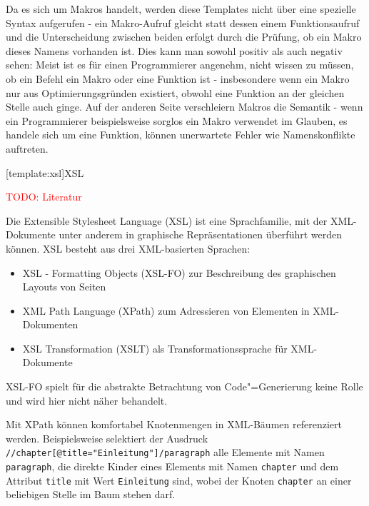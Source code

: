 \documentclass[11pt, a4paper, bibgerm]{scrbook}
\newcommand\icode[1]{\lstinline?#1?}
\newcommand{\todo}[1]{
  \textcolor{red}{TODO: #1}
}
\newcommand\lsection{}
\newcommand{\cgen}{Code"=Generierung}
\begin{document}
Da es sich um Makros handelt, werden diese Templates nicht über eine
spezielle Syntax aufgerufen - ein Makro-Aufruf gleicht statt dessen
einem Funktionsaufruf und die Unterscheidung zwischen beiden erfolgt
durch die Prüfung, ob ein Makro dieses Namens vorhanden ist. Dies kann
man sowohl positiv als auch negativ sehen: Meist ist es für einen
Programmierer angenehm, nicht wissen zu müssen, ob ein Befehl ein Makro
oder eine Funktion ist - insbesondere wenn ein Makro nur aus
Optimierungsgründen existiert, obwohl eine Funktion an der gleichen
Stelle auch ginge. Auf der anderen Seite verschleiern Makros die
Semantik - wenn ein Programmierer beispielsweise sorglos ein Makro
verwendet im Glauben, es handele sich um eine Funktion, können
unerwartete Fehler wie Namenskonflikte auftreten.

\lsection[template:xsl]{XSL}

\todo{Literatur}

Die Extensible Stylesheet Language (XSL) ist eine Sprachfamilie, mit der
XML-Dokumente unter anderem in graphische Repräsentationen überführt
werden können. XSL besteht aus drei XML-basierten Sprachen:
\begin{itemize}
\item XSL - Formatting Objects (XSL-FO) zur Beschreibung des graphischen Layouts von Seiten
\item XML Path Language (XPath) zum Adressieren von Elementen in XML-Dokumenten
\item XSL Transformation (XSLT) als Transformationssprache für XML-Dokumente
\end{itemize}
XSL-FO spielt für die abstrakte Betrachtung von \cgen{} keine Rolle und
wird hier nicht näher behandelt.

Mit XPath können komfortabel Knotenmengen in XML-Bäumen referenziert
werden. Beispielsweise selektiert der Ausdruck
\icode{//chapter[@title="Einleitung"]/paragraph} alle Elemente mit Namen
\icode{paragraph}, die direkte Kinder eines Elements mit Namen
\icode{chapter} und dem Attribut \icode{title} mit Wert
\icode{Einleitung} sind, wobei der Knoten \icode{chapter} an einer
beliebigen Stelle im Baum stehen darf.
\end{document}
